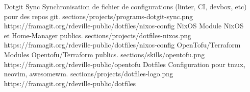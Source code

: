 \project
{Dotgit Sync}
{Synchronisation de fichier de configurations (linter, CI, devbox, etc) pour des repos git.}
{sections/projects/programs-dotgit-sync.png}
{https://framagit.org/rdeville-public/dotfiles/nixos-config}
\project%
{NixOS}%
{Module NixOS et Home-Manager publics.}%
{sections/projects/dotfiles-nixos.png}%
{https://framagit.org/rdeville-public/dotfiles/nixos-config}
\project%
{OpenTofu/Terraform}%
{Modules Opentofu/Terraform publics.}%
{sections/skills/opentofu.png}%
{https://framagit.org/rdeville-public/opentofu}
\project%
{Dotfiles}%
{Configuration pour tmux, neovim, awesomewm.}%
{sections/projects/dotfiles-logo.png}%
{https://framagit.org/rdeville-public/dotfiles}
